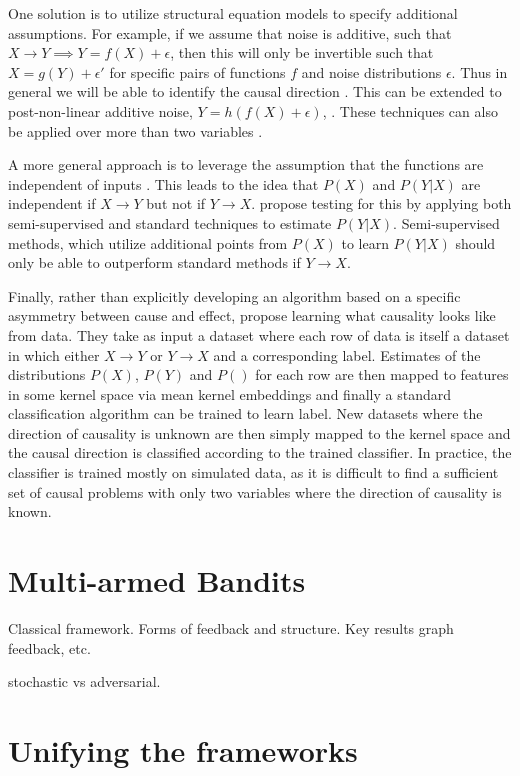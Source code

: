 \documentclass[11pt,a4paper]{article}
\begin{document}
One solution is to utilize structural equation models to specify additional assumptions. For example, if we assume that noise is additive, such that $X \rightarrow Y \implies Y = f(X)+\epsilon$, then this will only be invertible such that $X = g(Y) + \epsilon'$ for specific pairs of functions $f$ and noise distributions $\epsilon$. Thus in general we will be able to identify the causal direction \cite{Hoyer2009}. This can be extended to post-non-linear additive noise, $Y = h(f(X)+ \epsilon)$, \cite{Zhang2008a}. These techniques can also be applied over more than two variables \cite{}.

A more general approach is to leverage the assumption that the functions are independent of inputs \cite{}. This leads to the idea that $P(X)$ and $P(Y|X)$ are independent if $X \rightarrow Y$ but not if $Y \rightarrow X$. \cite{} propose testing for this by applying both semi-supervised and standard techniques to estimate $P(Y|X)$. Semi-supervised methods, which utilize additional points from $P(X)$ to learn $P(Y|X)$ should only be able to outperform standard methods if $Y \rightarrow X$. 

Finally, rather than explicitly developing an algorithm based on a specific asymmetry between cause and effect, \cite{} propose learning what causality looks like from data. They take as input a dataset where each row of data is itself a dataset in which either $X \rightarrow Y$ or $Y \rightarrow X$ and a corresponding label. Estimates of the distributions $P(X)$, $P(Y)$ and $P()$ for each row are then mapped to features in some kernel space via mean kernel embeddings and finally a standard classification algorithm can be trained to learn label. New datasets where the direction of causality is unknown are then simply mapped to the kernel space and the causal direction is classified according to the trained classifier. In practice, the classifier is trained mostly on simulated data, as it is difficult to find a sufficient set of causal problems with only two variables where the direction of causality is known. 

 
\section{Multi-armed Bandits}

Classical framework. Forms of feedback and structure. Key results graph feedback, etc. 

stochastic vs adversarial. 


\section{Unifying the frameworks}
\end{document}
